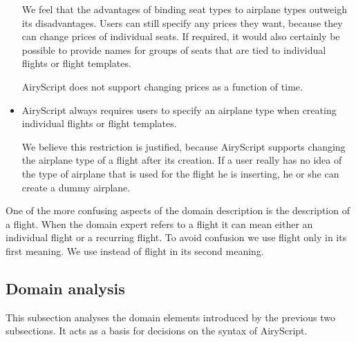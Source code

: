 \begin{itemize}
    We feel that the advantages of binding seat types to airplane types outweigh
    its disadvantages. Users can still specify any prices they want, because
    they can change prices of individual seats. If required, it would also
    certainly be possible to provide names for groups of seats that are tied to
    individual flights or flight templates.

    AiryScript does not support changing prices as a function of time.

  \item AiryScript always requires users to specify an airplane type when
    creating individual flights or flight templates.

    We believe this restriction is justified, because AiryScript supports
    changing the airplane type of a flight after its creation. If a user really
    has no idea of the type of airplane that is used for the flight he is
    inserting, he or she can create a dummy airplane.
\end{itemize}

One of the more confusing aspects of the domain description is the description
of a flight. When the domain expert refers to a flight it can mean either an
individual flight or a recurring flight. To avoid confusion we use flight only
in its first meaning. We use   instead of flight in its
second meaning.

\subsection{Domain analysis}
\label{sec:domain_analysis}
This subsection analyses the domain elements introduced by the previous two
subsections. It acts as a basis for decisions on the syntax of AiryScript.

